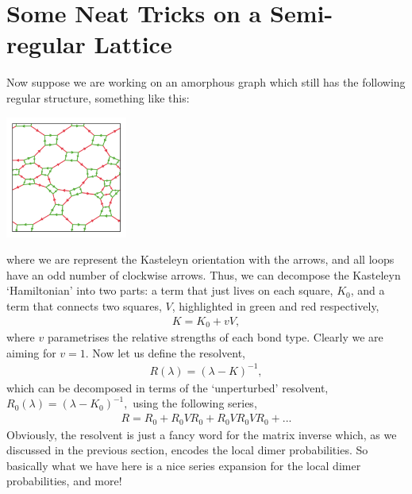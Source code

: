 \documentclass[11pt, oneside]{article} %
\numberwithin{equation}{section}
\begin{document}
\section{Some Neat Tricks on a Semi-regular Lattice}
Now suppose we are working on an amorphous graph which still has the following regular structure, something like this:
\begin{center}
    \includegraphics[width=0.3\textwidth]{lattice.png}
\end{center}
where we are represent the Kasteleyn orientation with the arrows, and all loops have an odd number of clockwise arrows. Thus, we can decompose the Kasteleyn `Hamiltonian' into two parts: a term that just lives on each square, $K_{0}$, and a term that connects two squares, $V$, highlighted in green and red respectively,
\begin{align}
    K = K_{0} + v V,
\end{align}
where $v$ parametrises the relative strengths of each bond type. Clearly we are aiming for $v=1$. Now let us define the resolvent,
\begin{align}
    R(\lambda) = (\lambda - K)^{-1},
\end{align}
which can be decomposed in terms of the `unperturbed' resolvent, $R_0(\lambda) = ( \lambda - K_0  )^{-1},$ using the following series,
\begin{align} \label{eqn:resolvent_expansion}
     R = R_0 + R_0VR_0 + R_0VR_0VR_0 + ...
\end{align}
Obviously, the resolvent is just a fancy word for the matrix inverse which, as we discussed in the previous section, encodes the local dimer probabilities. So basically what we have here is a nice series expansion for the local dimer probabilities, and more! 
\end{document}
